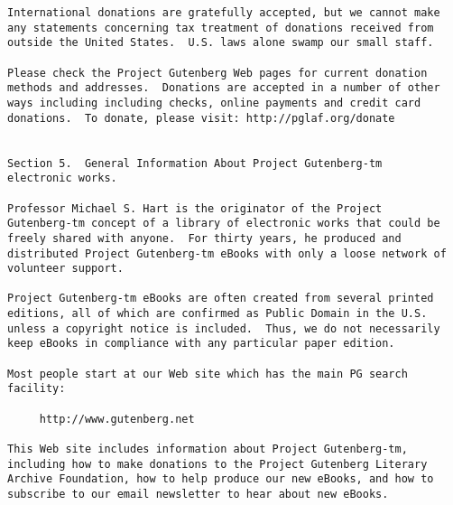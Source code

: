 \documentclass[oneside,12pt]{book}
\begin{document}
\begin{verbatim}
International donations are gratefully accepted, but we cannot make
any statements concerning tax treatment of donations received from
outside the United States.  U.S. laws alone swamp our small staff.

Please check the Project Gutenberg Web pages for current donation
methods and addresses.  Donations are accepted in a number of other
ways including including checks, online payments and credit card
donations.  To donate, please visit: http://pglaf.org/donate


Section 5.  General Information About Project Gutenberg-tm
electronic works.

Professor Michael S. Hart is the originator of the Project
Gutenberg-tm concept of a library of electronic works that could be
freely shared with anyone.  For thirty years, he produced and
distributed Project Gutenberg-tm eBooks with only a loose network of
volunteer support.

Project Gutenberg-tm eBooks are often created from several printed
editions, all of which are confirmed as Public Domain in the U.S.
unless a copyright notice is included.  Thus, we do not necessarily
keep eBooks in compliance with any particular paper edition.

Most people start at our Web site which has the main PG search
facility:

     http://www.gutenberg.net

This Web site includes information about Project Gutenberg-tm,
including how to make donations to the Project Gutenberg Literary
Archive Foundation, how to help produce our new eBooks, and how to
subscribe to our email newsletter to hear about new eBooks.
\end{verbatim}
\end{document}

